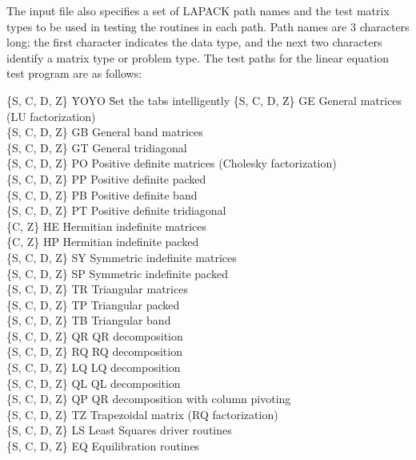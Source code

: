 The input file also specifies a set of LAPACK path names and the
test matrix types to be used in testing the routines in each path.
Path names are 3 characters long; the first character indicates the
data type, and the next two characters identify a matrix type or problem
type.
The test paths for the linear equation test program are as follows:

\begin{tabbing}
\{S, C, D, Z\}  \=  YOYO \=  Set the tabs intelligently \kill
\{S, C, D, Z\}  \>  GE  \>  General matrices (LU factorization) \\
\{S, C, D, Z\}  \>  GB  \>  General band matrices \\
\{S, C, D, Z\}  \>  GT  \>  General tridiagonal \\
\{S, C, D, Z\}  \>  PO  \>  Positive definite matrices (Cholesky factorization) \\
\{S, C, D, Z\}  \>  PP  \>  Positive definite packed \\
\{S, C, D, Z\}  \>  PB  \>  Positive definite band \\
\{S, C, D, Z\}  \>  PT  \>  Positive definite tridiagonal \\
\{C, Z\}        \>  HE  \>  Hermitian indefinite matrices \\
\{C, Z\}        \>  HP  \>  Hermitian indefinite packed \\
\{S, C, D, Z\}  \>  SY  \>  Symmetric indefinite matrices \\
\{S, C, D, Z\}  \>  SP  \>  Symmetric indefinite packed \\
\{S, C, D, Z\}  \>  TR  \>  Triangular matrices \\
\{S, C, D, Z\}  \>  TP  \>  Triangular packed \\
\{S, C, D, Z\}  \>  TB  \>  Triangular band \\
\{S, C, D, Z\}  \>  QR  \>  QR decomposition \\
\{S, C, D, Z\}  \>  RQ  \>  RQ decomposition \\
\{S, C, D, Z\}  \>  LQ  \>  LQ decomposition \\
\{S, C, D, Z\}  \>  QL  \>  QL decomposition \\
\{S, C, D, Z\}  \>  QP  \>  QR decomposition with column pivoting \\
\{S, C, D, Z\}  \>  TZ  \>  Trapezoidal matrix (RQ factorization) \\
\{S, C, D, Z\}  \>  LS  \>  Least Squares driver routines \\
\{S, C, D, Z\}  \>  EQ  \>  Equilibration routines
\end{tabbing}


